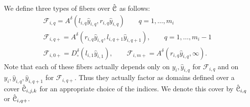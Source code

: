 \documentclass[reqno]{amsart}
\renewcommand\~[1]{\widetilde{#1}}
\def\cF{{\mathcal F}} \def\cL{{\mathcal L}} \def\cR{{\mathcal R}}
\begin{document}
We define three types of fibers over $\hat{{\mathcal C}}$ as follows:
\begin{gather}
  \cF_{i,q}=A^\delta(l_{i,q}\hat y_{i,q},r_{i,q}\hat y_{i,q}) \qquad q=1,\ldots,m_i \\
  \cF_{i,q+}= A^\delta(r_{i,q}\hat y_{i,q},l_{i,q+1}\hat y_{i,q+1}), \qquad q=1,\ldots,m_i-1 \\
  \cF_{i,0+}=D_\circ^\delta(l_{i,1}\hat y_{i,1}), \qquad \cF_{i,m+} = A^\delta(r_{i,q}\hat y_{i,q},\infty).
\end{gather}
Note that each of these fibers actually depends only on
$y_i,\hat y_{i,q}$ for $\cF_{i,q}$ and on
$y_i,\hat y_{i,q},\hat y_{i,q+1}$ for $\cF_{i,q+}$. Thus they actually
factor as domains defined over a cover $\hat{{\mathcal C}}_{i,j,k}$ for an
appropriate choice of the indices. We denote this cover by
$\hat{{\mathcal C}}_{i,q}$ or $\hat{{\mathcal C}}_{i,q+}$.
\end{document}
